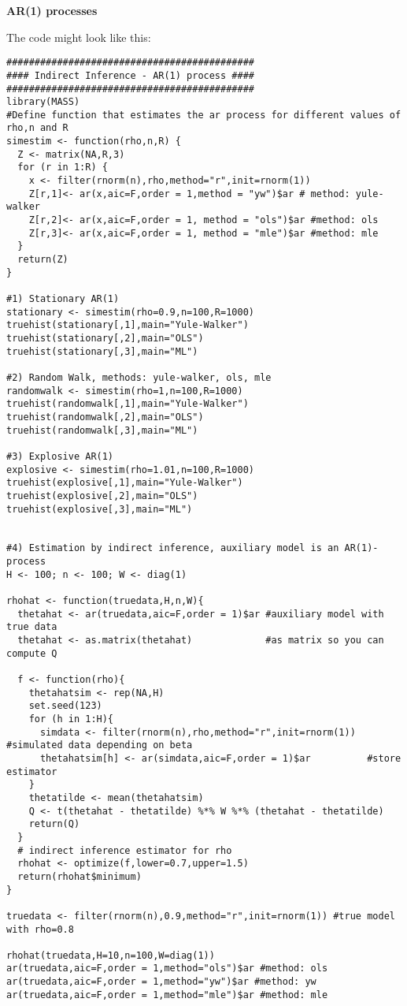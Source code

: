 \documentclass{article}
\begin{document}
\begin{solution}
\textbf{AR(1) processes}

The code might look like this:
\begin{verbatim}
############################################
#### Indirect Inference - AR(1) process ####
############################################
library(MASS)
#Define function that estimates the ar process for different values of rho,n and R
simestim <- function(rho,n,R) {
  Z <- matrix(NA,R,3)
  for (r in 1:R) {
    x <- filter(rnorm(n),rho,method="r",init=rnorm(1))
    Z[r,1]<- ar(x,aic=F,order = 1,method = "yw")$ar # method: yule-walker
    Z[r,2]<- ar(x,aic=F,order = 1, method = "ols")$ar #method: ols
    Z[r,3]<- ar(x,aic=F,order = 1, method = "mle")$ar #method: mle
  }
  return(Z)
}

#1) Stationary AR(1)
stationary <- simestim(rho=0.9,n=100,R=1000)
truehist(stationary[,1],main="Yule-Walker")
truehist(stationary[,2],main="OLS")
truehist(stationary[,3],main="ML")

#2) Random Walk, methods: yule-walker, ols, mle
randomwalk <- simestim(rho=1,n=100,R=1000)
truehist(randomwalk[,1],main="Yule-Walker")
truehist(randomwalk[,2],main="OLS")
truehist(randomwalk[,3],main="ML")

#3) Explosive AR(1)
explosive <- simestim(rho=1.01,n=100,R=1000)
truehist(explosive[,1],main="Yule-Walker")
truehist(explosive[,2],main="OLS")
truehist(explosive[,3],main="ML")


#4) Estimation by indirect inference, auxiliary model is an AR(1)-process
H <- 100; n <- 100; W <- diag(1)

rhohat <- function(truedata,H,n,W){
  thetahat <- ar(truedata,aic=F,order = 1)$ar #auxiliary model with true data
  thetahat <- as.matrix(thetahat)             #as matrix so you can compute Q

  f <- function(rho){
    thetahatsim <- rep(NA,H)
    set.seed(123)
    for (h in 1:H){
      simdata <- filter(rnorm(n),rho,method="r",init=rnorm(1)) #simulated data depending on beta
      thetahatsim[h] <- ar(simdata,aic=F,order = 1)$ar          #store estimator
    }
    thetatilde <- mean(thetahatsim)
    Q <- t(thetahat - thetatilde) %*% W %*% (thetahat - thetatilde)
    return(Q)
  }
  # indirect inference estimator for rho
  rhohat <- optimize(f,lower=0.7,upper=1.5)
  return(rhohat$minimum)
}

truedata <- filter(rnorm(n),0.9,method="r",init=rnorm(1)) #true model with rho=0.8

rhohat(truedata,H=10,n=100,W=diag(1))
ar(truedata,aic=F,order = 1,method="ols")$ar #method: ols
ar(truedata,aic=F,order = 1,method="yw")$ar #method: yw
ar(truedata,aic=F,order = 1,method="mle")$ar #method: mle
\end{verbatim}
\end{solution}
\end{document}
